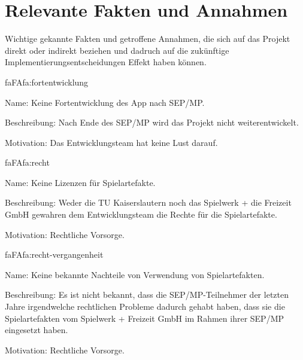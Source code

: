 \section{Relevante Fakten und Annahmen}

Wichtige gekannte Fakten und getroffene Annahmen, die sich auf das Projekt direkt oder indirekt beziehen und dadruch auf die zukünftige Implementierungsentscheidungen Effekt haben können.

\setcounter{fa}{10}

\begin{description}[leftmargin=5em, style=sameline]
	
	\begin{lhp}{fa}{FA}{fa:fortentwicklung}
		\item [Name:] Keine Fortentwicklung des App nach SEP/MP.
		\item [Beschreibung:] Nach Ende des SEP/MP wird das Projekt nicht weiterentwickelt.
		\item [Motivation:] Das Entwicklungsteam hat keine Lust darauf.
	\end{lhp}
	
	\begin{lhp}{fa}{FA}{fa:recht}
		\item [Name:] Keine Lizenzen für Spielartefakte.
		\item [Beschreibung:] Weder die TU Kaiserslautern noch das Spielwerk + die Freizeit GmbH gewahren dem Entwicklungsteam die Rechte für die Spielartefakte.
		\item [Motivation:] Rechtliche Vorsorge.
	\end{lhp}
	
	\begin{lhp}{fa}{FA}{fa:recht-vergangenheit}
		\item [Name:] Keine bekannte Nachteile von Verwendung von Spielartefakten.
		\item [Beschreibung:] Es ist nicht bekannt, dass die SEP/MP-Teilnehmer der letzten Jahre irgendwelche rechtlichen Probleme dadurch gehabt haben, dass sie die Spielartefakten vom Spielwerk + Freizeit GmbH im Rahmen ihrer SEP/MP eingesetzt haben.
		\item [Motivation:] Rechtliche Vorsorge.
	\end{lhp}
	
	
\end{description}

